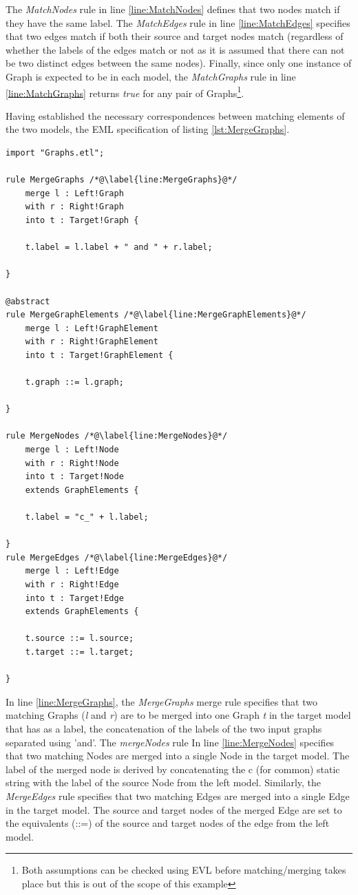 The \emph{MatchNodes} rule in line \ref{line:MatchNodes} defines that two nodes match if they have the same label. The \emph{MatchEdges} rule in line \ref{line:MatchEdges} specifies that two edges match if both their source and target nodes match (regardless of whether the labels of the edges match or not as it is assumed that there can not be two distinct edges between the same nodes). Finally, since only one instance of Graph is expected to be in each model, the \emph{MatchGraphs} rule in line \ref{line:MatchGraphs} returns \emph{true} for any pair of Graphs\footnote{Both assumptions can be checked using EVL before matching/merging takes place but this is out of the scope of this example}.

Having established the necessary correspondences between matching elements of the two models, the EML specification of listing \ref{lst:MergeGraphs}.

\begin{lstlisting}[float=tbp, label=lst:MergeGraphs, caption=EML module for merging two instances of the Graph metamodel on the correspondences identified in Listing \ref{lst:CompareGraph} , language=EML]
import "Graphs.etl";

rule MergeGraphs /*@\label{line:MergeGraphs}@*/
	merge l : Left!Graph
	with r : Right!Graph
	into t : Target!Graph {
	
	t.label = l.label + " and " + r.label;
	
}

@abstract
rule MergeGraphElements /*@\label{line:MergeGraphElements}@*/
	merge l : Left!GraphElement
	with r : Right!GraphElement
	into t : Target!GraphElement {
	
	t.graph ::= l.graph;
	
}

rule MergeNodes /*@\label{line:MergeNodes}@*/
	merge l : Left!Node
	with r : Right!Node
	into t : Target!Node 
	extends GraphElements {
	
	t.label = "c_" + l.label;
	
}
rule MergeEdges /*@\label{line:MergeEdges}@*/
	merge l : Left!Edge
	with r : Right!Edge
	into t : Target!Edge 
	extends GraphElements {
	
	t.source ::= l.source;
	t.target ::= l.target;
	
}
\end{lstlisting}

In line \ref{line:MergeGraphs}, the \emph{MergeGraphs} merge rule specifies that two matching Graphs (\emph{l} and \emph{r}) are to be merged into one Graph \emph{t} in the target model that has as a label, the concatenation of the labels of the two input graphs separated using 'and'. The \emph{mergeNodes} rule In line \ref{line:MergeNodes} specifies that two matching Nodes are merged into a single Node in the target model. The label of the merged node is derived by concatenating the c (for common) static string with the label of the source Node from the left model. Similarly, the \emph{MergeEdges} rule specifies that two matching Edges are merged into a single Edge in the target model. The source and target nodes of the merged Edge are set to the equivalents (::=) of the source and target nodes of the edge from the left model.

